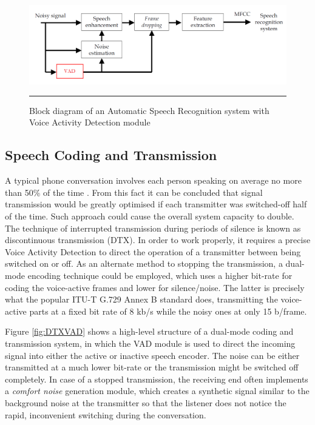 \begin{figure}[htbp]
	\centering
		\includegraphics[width=1\columnwidth]{Figures/ASRVAD.png}
		\rule{37em}{0.5pt}
	\caption[Automatic Speech Recognition system with Voice Activity Detection module]{Block diagram of an Automatic Speech Recognition system with Voice Activity Detection module \cite{RamirezGorriz}}
	\label{fig:ASRVAD}
\end{figure}

\subsection{Speech Coding and Transmission}

A typical phone conversation involves each person speaking on average no more than 50\% of the time \citep{GSMControl}. From this fact it can be concluded that signal transmission would be greatly optimised if each transmitter was switched-off half of the time. Such approach could cause the overall system capacity to double. The technique of interrupted transmission during periods of silence is known as discontinuous transmission (DTX). In order to work properly, it requires a precise Voice Activity Detection to direct the operation of a transmitter between being switched on or off. As an alternate method to stopping the transmission, a dual-mode encoding technique could be employed, which uses a higher bit-rate for coding the voice-active frames and lower for silence/noise. The latter is precisely what the popular ITU-T G.729 Annex B \cite{G729} standard does, transmitting the voice-active parts at a fixed bit rate of 8 kb/s while the noisy ones at only 15 b/frame.

Figure \ref{fig:DTXVAD} shows a high-level structure of a dual-mode coding and transmission system, in which the VAD module is used to direct the incoming signal into either the active or inactive speech encoder. The noise can be either transmitted at a much lower bit-rate or the transmission might be switched off completely. In case of a stopped transmission, the receiving end often implements a \emph{comfort noise} \citep{GSMControl,G729,RamirezGorriz} generation module, which creates a synthetic signal similar to the background noise at the transmitter so that the listener does not notice the rapid, inconvenient switching during the conversation.

